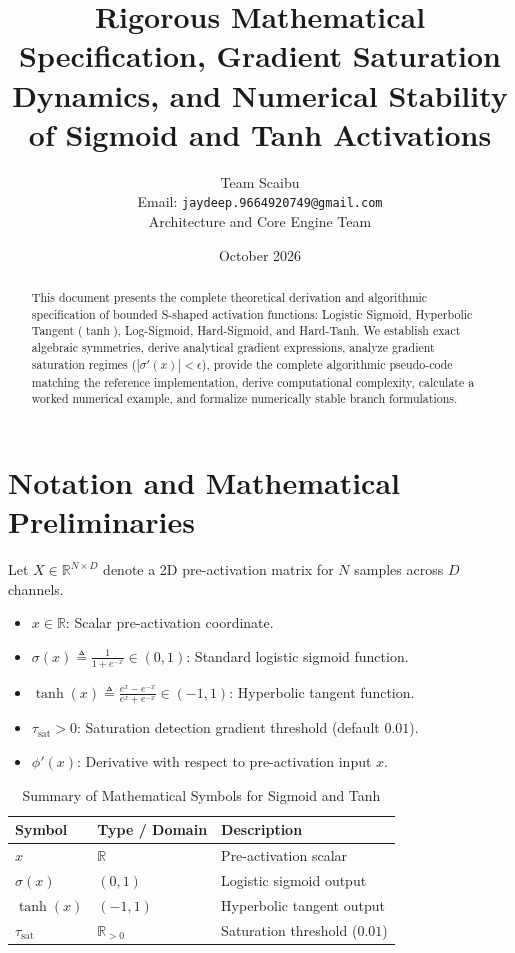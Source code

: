 \documentclass[11pt,a4paper]{article}
\title{\textbf{Rigorous Mathematical Specification, Gradient Saturation Dynamics, and Numerical Stability of Sigmoid and Tanh Activations}}
\author{Team Scaibu \\ \small Email: \texttt{jaydeep.9664920749@gmail.com} \\ \small Architecture and Core Engine Team}
\date{October 2026}
\theoremstyle{definition}
\begin{document}
\maketitle

\begin{abstract}
This document presents the complete theoretical derivation and algorithmic specification of bounded S-shaped activation functions: Logistic Sigmoid, Hyperbolic Tangent ($\tanh$), Log-Sigmoid, Hard-Sigmoid, and Hard-Tanh. We establish exact algebraic symmetries, derive analytical gradient expressions, analyze gradient saturation regimes ($|\sigma'(x)| < \epsilon$), provide the complete algorithmic pseudo-code matching the reference implementation, derive computational complexity, calculate a worked numerical example, and formalize numerically stable branch formulations.
\end{abstract}

\section{Notation and Mathematical Preliminaries}

Let $X \in \mathbb{R}^{N \times D}$ denote a 2D pre-activation matrix for $N$ samples across $D$ channels.

\begin{itemize}
    \item $x \in \mathbb{R}$: Scalar pre-activation coordinate.
    \item $\sigma(x) \triangleq \frac{1}{1 + e^{-x}} \in (0, 1)$: Standard logistic sigmoid function.
    \item $\tanh(x) \triangleq \frac{e^x - e^{-x}}{e^x + e^{-x}} \in (-1, 1)$: Hyperbolic tangent function.
    \item $\tau_{\text{sat}} > 0$: Saturation detection gradient threshold (default $0.01$).
    \item $\phi'(x)$: Derivative with respect to pre-activation input $x$.
\end{itemize}

\begin{table}[h]
\centering
\caption{Summary of Mathematical Symbols for Sigmoid and Tanh}
\begin{tabular}{lll}
\toprule
\textbf{Symbol} & \textbf{Type / Domain} & \textbf{Description} \\
\midrule
$x$ & $\mathbb{R}$ & Pre-activation scalar \\
$\sigma(x)$ & $(0, 1)$ & Logistic sigmoid output \\
$\tanh(x)$ & $(-1, 1)$ & Hyperbolic tangent output \\
$\tau_{\text{sat}}$ & $\mathbb{R}_{> 0}$ & Saturation threshold ($0.01$) \\
\bottomrule
\end{tabular}
\end{table}
\end{document}
